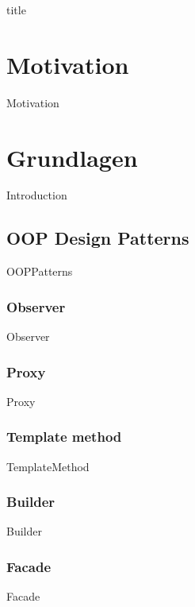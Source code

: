 \documentclass{article}
\begin{document}
{title}

\frontmatter

\tableofcontents

\listoffigures
\listoftables

\mainmatter

\section{Motivation}
    {Motivation}

\section{Grundlagen}
    {Introduction}

    \subsection{OOP Design Patterns}
        {OOPPatterns}

        \subsubsection{Observer}
            {Observer}

        \subsubsection{Proxy}
            {Proxy}

        \subsubsection{Template method}
        \label{kap:gof:templatemethod}
            {TemplateMethod}

        \subsubsection{Builder}
            {Builder}

        \subsubsection{Facade}
        \label{kap:gof:facade}
            {Facade}
\end{document}
